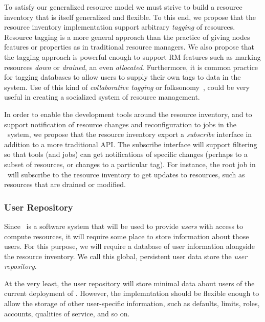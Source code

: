 To satisfy our generalized resource model we must strive to build
a resource inventory that is itself generalized and flexible.
To this end, we propose that the resource inventory implementation
support arbitrary \emph{tagging} of resources. Resource tagging
is a more general approach than the practice of giving nodes
features or properties as in traditional resource managers. We also
propose that the tagging approach is powerful enough to support RM
features such as marking resources \emph{down} or \emph{drained},
an even \emph{allocated}. Furthermore, it is common practice for
tagging databases to allow users to supply their own tags to data
in the system. Use of this kind of \emph{collaborative tagging}
or folksonomy~\cite{wiki:folksonomy}, could be very useful in
creating a socialized system of resource management.

In order to enable the development tools around the resource
inventory, and to support notification of resource changes and
reconfiguration to jobs in the \ngrm\ system, we propose that
the resource inventory export a \emph{subscribe} interface in
addition to a more traditional API. The subscribe interface will
support filtering so that tools (and jobs) can get notifications
of specific changes (perhaps to a subset of resources, or changes
to a particular tag). For instance, the root job in \ngrm\ will
subscribe to the resource inventory to get updates to resources,
such as resources that are drained or modified.

\subsubsection{User Repository}
\ifcomments
{}

Since \ngrm\ is a software system that will be used to provide
\emph{users} with access to compute resources, it will require
some place to store information about those users. For this
purpose, we will require a database of user information alongside
the resource inventory. We call this global, persistent user
data store the \emph{user repository}.

At the very least, the user repository will store minimal
data about users of the current deployment of \ngrm. However,
the implemntation should be flexible enough to allow the storage
of other user-specific information, such as defaults, limits,
roles, accounts, qualities of service, and so on.

